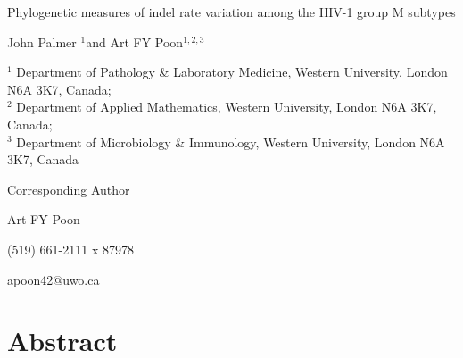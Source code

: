 \documentclass[12pt]{article}
\begin{document}
\baselineskip 24pt
\begin{flushleft}

{\LARGE Phylogenetic measures of indel rate variation among the HIV-1 group M subtypes}  %

{John Palmer $^{1}$and Art FY Poon$^{1,2,3}$}

\baselineskip 16pt

$^1$ Department of Pathology \& Laboratory Medicine, Western University, London N6A 3K7, Canada;\\
$^2$ Department of Applied Mathematics, Western University, London N6A 3K7, Canada;\\
$^3$ Department of Microbiology \& Immunology, Western University, London N6A 3K7, Canada
\end{flushleft}



\vspace*{\fill}
\baselineskip 0pt

\begin{flushright}
Corresponding Author

Art FY Poon

(519) 661-2111 x 87978

apoon42@uwo.ca
\end{flushright}
\newpage


\onehalfspacing
\pagewiselinenumbers

\section* {Abstract}
\end{document}
